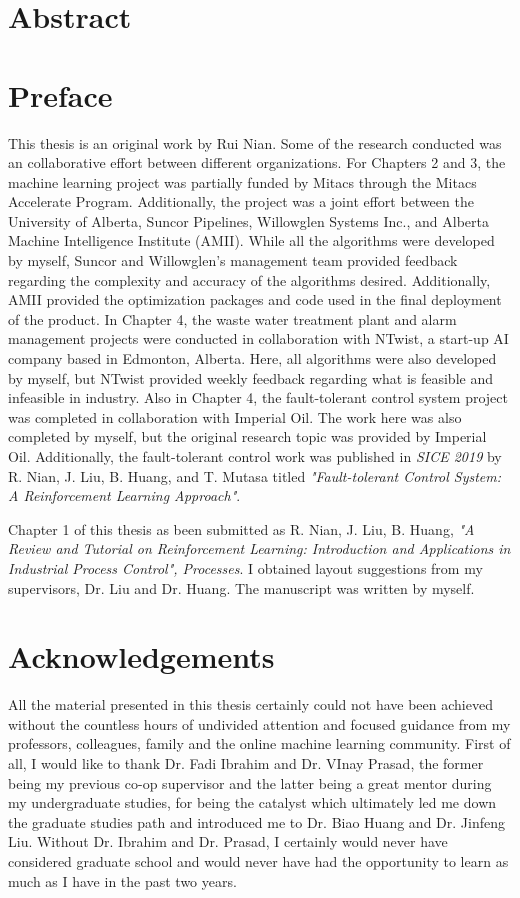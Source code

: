 \documentclass[12pt]{report}
\begin{document}
\chapter*{Abstract}

\chapter*{Preface}
This thesis is an original work by Rui Nian. Some of the research conducted was an collaborative effort between different organizations.  For Chapters 2 and 3, the machine learning project was partially funded by Mitacs through the Mitacs Accelerate Program.  Additionally, the project was a joint effort between the University of Alberta, Suncor Pipelines, Willowglen Systems Inc., and Alberta Machine Intelligence Institute (AMII). While all the algorithms were developed by myself, Suncor and Willowglen's management team provided feedback regarding the complexity and accuracy of the algorithms desired. Additionally, AMII provided the optimization packages and code used in the final deployment of the product. In Chapter 4, the waste water treatment plant and alarm management projects were conducted in collaboration with NTwist, a start-up AI company based in Edmonton, Alberta. Here, all algorithms were also developed by myself, but NTwist provided weekly feedback regarding what is feasible and infeasible in industry. Also in Chapter 4, the fault-tolerant control system project was completed in collaboration with Imperial Oil. The work here was also completed by myself, but the original research topic was provided by Imperial Oil. Additionally, the fault-tolerant control work was published in \textit{SICE 2019} by R. Nian, J. Liu, B. Huang, and T. Mutasa titled \textit{"Fault-tolerant Control System: A Reinforcement Learning Approach"}.

Chapter 1 of this thesis as been submitted as R. Nian, J. Liu, B. Huang, \textit{"A Review and Tutorial on Reinforcement Learning: Introduction and Applications in Industrial Process Control", Processes}.  I obtained layout suggestions from my supervisors, Dr. Liu and Dr. Huang.  The manuscript was written by myself. 

\tableofcontents
\listoffigures
\listoftables

\chapter*{Acknowledgements}
All the material presented in this thesis certainly could not have been achieved without the countless hours of undivided attention and focused guidance from my professors, colleagues, family and the online machine learning community. First of all, I would like to thank Dr. Fadi Ibrahim and Dr. VInay Prasad, the former being my previous co-op supervisor and the latter being a great mentor during my undergraduate studies, for being the catalyst which ultimately led me down the graduate studies path and introduced me to Dr. Biao Huang and Dr. Jinfeng Liu. Without Dr. Ibrahim and Dr. Prasad, I certainly would never have considered graduate school and would never have had the opportunity to learn as much as I have in the past two years.  
\end{document}
